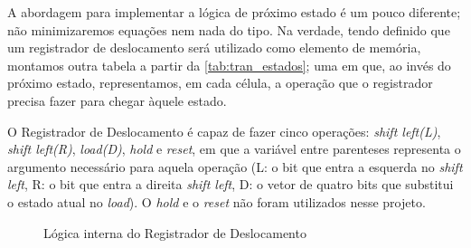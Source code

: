 \documentclass[a4paper,12pt]{article}
\begin{document}
A abordagem para implementar a lógica de próximo estado é um pouco diferente; não minimizaremos equações nem nada do tipo. Na verdade, tendo definido que um registrador de deslocamento será utilizado como elemento de memória, montamos outra tabela a partir da \autoref{tab:tran_estados}; uma em que, ao invés do próximo estado, representamos, em cada célula, a operação que o registrador precisa fazer para chegar àquele estado.

O Registrador de Deslocamento é capaz de fazer cinco operações: \textit{shift left(L)}, \textit{shift left(R)}, \textit{load(D)}, \textit{hold} e \textit{reset}, em que a variável entre parenteses representa o argumento necessário para aquela operação (L: o bit que entra a esquerda no \textit{shift left}, R: o bit que entra a direita \textit{shift left}, D: o vetor de quatro bits que substitui o estado atual no \textit{load}). O \textit{hold} e o \textit{reset} não foram utilizados nesse projeto.

\begin{figure}[H]
    \centering
    
    \vspace{-35pt}
    \caption{Lógica interna do Registrador de Deslocamento}
    \label{fig:shiftRegister}
\end{figure}
\end{document}
